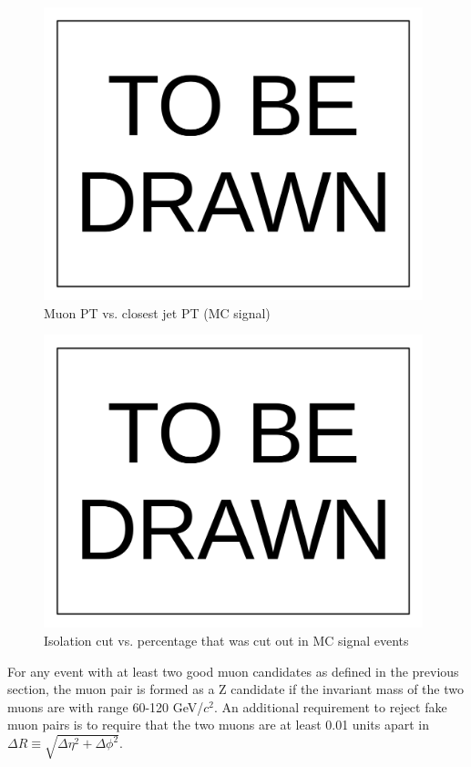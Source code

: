 \documentclass[10pt,a4paper,onecolumn]{	article}
\begin{document}
\begin{figure}
\includegraphics[width=110mm]{ToBeDrawn.pdf}
\caption{Muon PT vs. closest jet PT (MC signal)}
\label{Figure_CandidateMuonVsClosestJetPT}
\end{figure}

\begin{figure}
\includegraphics[width=110mm]{ToBeDrawn.pdf}
\caption{Isolation cut vs. percentage that was cut out in MC signal events}
\label{Figure_IsolationCutVsRejectionPercentage}
\end{figure}

For any event with at least two good muon candidates as defined in the previous section, the muon pair is formed as a Z candidate if
the invariant mass of the two muons are with range 60-120 GeV/$c^2$.  An additional requirement to reject fake muon pairs is to require
that the two muons are at least 0.01 units apart in $\Delta R \equiv \sqrt{\Delta\eta^2 + \Delta\phi^2}$.
\end{document}
